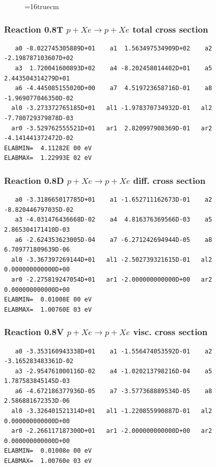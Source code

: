 \documentclass[12pt,dvips]{article}
\begin{document}
\begin{figure} \label{0.7}
\epsfxsize=16truecm
\end{figure}
\newpage


\subsubsection{
Reaction 0.8T   $ p + Xe \rightarrow p + Xe $ total cross
section }



\begin{small}\begin{verbatim}
   a0 -8.022745305889D+01    a1  1.563497534909D+02    a2 -2.198787103607D+02
   a3  1.720041600893D+02    a4 -8.202458014402D+01    a5  2.443504314279D+01
   a6 -4.445085155020D+00    a7  4.519723658716D-01    a8 -1.969077046350D-02
  al0 -3.273372765185D+01   al1 -1.978370734932D-01   al2 -7.780729379878D-03
  ar0 -3.529762555521D+01   ar1  2.820997908369D-01   ar2 -4.141441372472D-02
ELABMIN=  4.11282E 00 eV
ELABMAX=  1.22993E 02 eV
\end{verbatim}\end{small}

\subsubsection{
Reaction 0.8D    $p + Xe \rightarrow p + Xe  $ diff. cross
section }


\begin{small}\begin{verbatim}
   a0 -3.318665017785D+01    a1 -1.652711162673D-01    a2 -8.820446797035D-02
   a3 -4.031476436668D-02    a4  4.816376369566D-03    a5  2.865304171410D-03
   a6 -2.624353623005D-04    a7 -6.271242694944D-05    a8  6.709771809639D-06
  al0 -3.367397269144D+01   al1 -2.502739321615D-01   al2  0.000000000000D+00
  ar0 -2.275819247054D+01   ar1 -2.000000000000D+00   ar2  0.000000000000D+00
ELABMIN=  0.01008E 00 eV
ELABMAX=  1.00760E 03 eV
\end{verbatim}\end{small}

\subsubsection{
Reaction 0.8V   $ p + Xe \rightarrow p + Xe  $ visc. cross
section }


\begin{small}\begin{verbatim}
   a0 -3.353160943338D+01    a1 -1.556474053592D-01    a2 -3.165283483361D-02
   a3 -2.954761000116D-02    a4 -1.020213798216D-04    a5  1.787583845145D-03
   a6 -4.672186377936D-05    a7 -3.577368889534D-05    a8  2.586881672353D-06
  al0 -3.326401521314D+01   al1 -1.220855990887D-01   al2  0.000000000000D+00
  ar0 -2.266117187300D+01   ar1 -2.000000000000D+00   ar2  0.000000000000D+00
ELABMIN=  0.01008e 00 eV
ELABMAX=  1.00760e 03 eV
\end{verbatim}\end{small}
\end{document}
